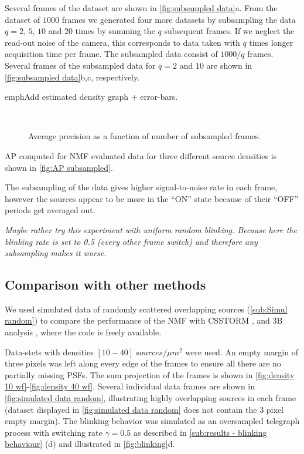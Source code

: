 Several frames of the dataset are shown in \autoref{fig:subsampled data}a. From the dataset of $1000$ frames we generated four more datasets by subsampling the data $q=2,\,5,\,10$ and $20$ times by summing the $q$ subsequent frames. If  we neglect the read-out noise of the camera, this corresponds to data taken with $q$ times longer acquisition time per frame. The subsampled data consist of $1000/q$ frames. Several frames of the subsampled data for $q=2$ and $10$ are shown in \autoref{fig:subsampled data}b,c, respectively. 

\fix emph{Add estimated density graph + error-bars}.
\begin{figure}[!h]	
	\newcommand{\wf}{.9\textwidth}
	\centering
	\\
	\caption{Average precision as a function of number of subsampled frames.}
	\label{fig:AP subsampled}
\end{figure}

AP computed for NMF evaluated data for three different source densities is shown in \autoref{fig:AP subsampled}. 

The subsampling of the data gives higher signal-to-noise rate in each frame, however the sources appear to be more in the ``ON'' state because of their ``OFF'' periods get averaged out. 

\emph{Maybe rather try this experiment with uniform random blinking. Because here the blinking rate is set to 0.5 (every other frame switch) and therefore any subsampling makes it worse.}

\clearpage
\subsection{Comparison with other methods\label{sub:results - comparison}} %
We used simulated data of randomly scattered overlapping sources (\autoref{sub:Simul random}) to compare the performance of the NMF with CSSTORM \cite{Zhu2012}, and 3B analysis \cite{Cox2011}, where the code is freely available. 

Data-stets with densities $[10 - 40]\ \unit{sources/\mu m^{2}}$ were used. An empty margin of three pixels was left along every edge of the frames to ensure all there are no partially missing PSFs. The sum projection of the frames is shown in \autoref{fig:density 10 wf}-\ref{fig:density 40 wf}. Several individual data frames are shown in \autoref{fig:simulated data random}, illustrating highly overlapping sources in each frame (dataset displayed in \autoref{fig:simulated data random} does not contain the 3 pixel empty margin). The blinking behavior was simulated as an oversampled telegraph process with switching rate $\gamma=0.5$ as described in \autoref{sub:results - blinking behaviour} (d) and illustrated in \autoref{fig:blinking}d.


